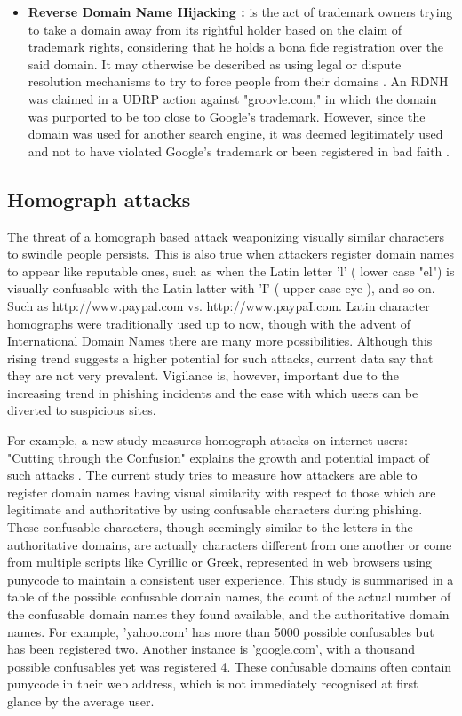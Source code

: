 \begin{itemize}
     \item \textbf{Reverse Domain Name Hijacking  :} is the act of trademark owners trying to take a domain away from its rightful holder based on the claim of trademark rights, considering that he holds a bona fide registration over the said domain. It may otherwise be described as using legal or dispute resolution mechanisms to try to force people from their domains \cite{Sun2006DomainTrademarkConflict}.  An RDNH was claimed in a UDRP action against "groovle.com," in which the domain was purported to be too close to Google's trademark. However, since the domain was used for another search engine, it was deemed legitimately used and not to have violated Google's trademark or been registered in bad faith \cite{Singh2011ReverseDomainHijacking}.
\end{itemize}


\subsection {Homograph attacks} 

The threat of a homograph based attack weaponizing visually similar characters to swindle people persists. This is also true when attackers register domain names to appear like reputable ones, such as when the Latin letter 'l' ( lower case "el") is visually confusable with the Latin latter with 'I' ( upper case eye ), and so on. Such as http://www.paypal.com vs. http://www.paypaI.com.  Latin character homographs were traditionally used up to now, though with the advent of International Domain Names there are many more possibilities. Although this rising trend suggests a higher potential for such attacks, current data say that they are not very prevalent. Vigilance is, however, important due to the increasing trend in phishing incidents and the ease with which users can be diverted to suspicious sites.

For example, a new study measures homograph attacks on internet users: "Cutting through the Confusion" explains the growth and potential impact of such attacks \cite{holgers2006homograph}. The current study tries to measure how attackers are able to register domain names having visual similarity with respect to those which are legitimate and authoritative by using confusable characters during phishing. These confusable characters, though seemingly similar to the letters in the authoritative domains, are actually characters different from one another or come from multiple scripts like Cyrillic or Greek, represented in web browsers using punycode to maintain a consistent user experience. This study is summarised in a table of the possible confusable domain names, the count of the actual number of the confusable domain names they found available, and the authoritative domain names. For example, 'yahoo.com' has more than 5000 possible confusables but has been registered two. Another instance is 'google.com', with a thousand possible confusables yet was registered 4. These confusable domains often contain punycode in their web address, which is not immediately recognised at first glance by the average user.

